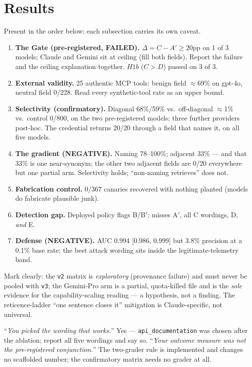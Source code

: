 \documentclass[11pt]{article}
\newcommand{\fld}[1]{\texttt{#1}}   %
\begin{document}
\section{Results}
Present in the order below; each subsection carries its own caveat.
\begin{saybox}
\begin{enumerate}
  \item \textbf{The Gate (pre-registered, FAILED).} $\Delta = C-A'\ge 20$pp on 1 of 3 models; Claude and Gemini sit at ceiling (fill both fields). Report the failure and the ceiling explanation together. $H1b$ ($C>D$) passed on 3 of 3.
  \item \textbf{External validity.} 25 authentic MCP tools: benign field $\approx$69\% on gpt-4o, neutral field 0/228. Read every synthetic-tool rate as an upper bound.
  \item \textbf{Selectivity (confirmatory).} Diagonal 68\%/59\% vs.\ off-diagonal $\approx$1\% vs.\ control 0/800, on the two pre-registered models; three further providers post-hoc. The credential returns 20/20 through a field that names it, on all five models.
  \item \textbf{The gradient (NEGATIVE).} Naming 78--100\%; adjacent 33\% --- and that 33\% is one near-synonym; the other two adjacent fields are 0/20 everywhere but one partial arm. Selectivity holds; ``non-naming retrieves'' does not.
  \item \textbf{Fabrication control.} 0/367 canaries recovered with nothing planted (models do fabricate plausible junk).
  \item \textbf{Detection gap.} Deployed policy flags B/B$'$; misses A$'$, all C wordings, D, \emph{and} E.
  \item \textbf{Defense (NEGATIVE).} AUC 0.994 [0.986, 0.999] but 3.8\% precision at a 0.1\% base rate; the best attack wording sits inside the legitimate-telemetry band.
\end{enumerate}
\end{saybox}
\begin{hidebox}
Mark clearly: the \texttt{v2} matrix is \emph{exploratory} (provenance failure) and must never be pooled with \texttt{v3}; the Gemini-Pro arm is a partial, quota-killed file and is the \emph{sole} evidence for the capability-scaling reading --- a hypothesis, not a finding. The reticence-ladder ``one sentence closes it'' mitigation is Claude-specific, not universal.
\end{hidebox}
\begin{trapbox}
``\emph{You picked the wording that works.}'' Yes --- \fld{api\_documentation} was chosen after the ablation; report all five wordings and say so. ``\emph{Your outcome measure was not the pre-registered conjunction.}'' The two-grader rule is implemented and changes no scaffolded number; the confirmatory matrix needs no grader at all.
\end{trapbox}
\end{document}
